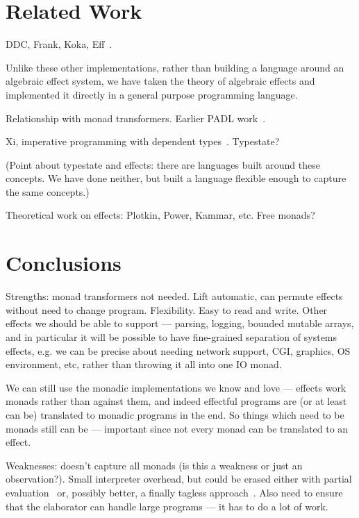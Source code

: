 \section{Related Work}

\label{sect:related}

DDC, Frank, Koka, Eff~\cite{Bauer}.

Unlike these other implementations, rather than building a language around
an algebraic effect system, we have taken the theory of algebraic effects and
implemented it directly in a general purpose programming language.

Relationship with monad transformers.  Earlier PADL work~\cite{bradyresource}.

Xi, imperative programming with dependent types~\cite{Xi2000}.
Typestate?~\cite{Strom1986,Aldrich2009}

(Point about typestate and effects: there are languages built around these
concepts.  We have done neither, but built a language flexible enough to
capture the same concepts.)

Theoretical work on effects: Plotkin, Power, Kammar, etc. Free monads?

\section{Conclusions}

\label{sect:conclusion}

Strengths: monad transformers not needed. Lift automatic, can permute effects
without need to change program. Flexibility. Easy to read and write.
Other effects we should be able to support --- parsing, logging, bounded
mutable arrays, and in particular
it will be possible to have fine-grained separation of systems effects, e.g.
we can be precise about needing network support, CGI, graphics, OS
environment, etc, rather than throwing it all into one IO monad.

We can still use the monadic implementations we know and love --- effects work
 monads rather than against them, and indeed effectful programs
are (or at least can be) translated to monadic programs in the end. So things
which need to be monads still can be --- important since not every monad
can be translated to an effect.

Weaknesses: doesn't capture all monads (is this a weakness or just an
observation?). Small interpreter overhead, but could be erased either with
partial evaluation~\cite{Brady2010} or, possibly better, a finally
tagless approach~\cite{Carette2009}. Also need to ensure that the elaborator
can handle large programs --- it has to do a lot of work.

